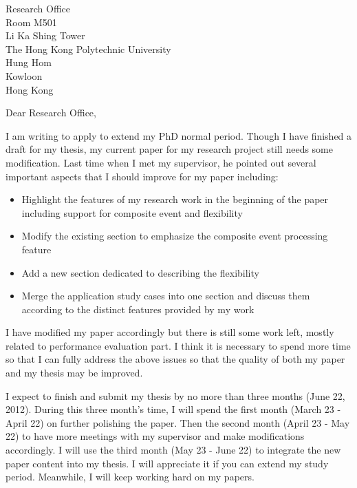 \documentclass[a4paper]{letter}
\begin{document}
\signature{Steven Lai}
\address{Room QT405 \\ The Hong Kong Polytechnic University \\ Hung Hom \\ Kowloon \\ Hong Kong}

\begin{letter}{Research Office \\ Room M501 \\ Li Ka Shing Tower \\ The Hong Kong Polytechnic University \\ Hung Hom \\ Kowloon \\ Hong Kong}
\opening{Dear Research Office,}

I am writing to apply to extend my PhD normal period. Though I have finished a draft for my thesis, my current paper for my research project still needs some modification. Last time when I met my supervisor, he pointed out several important aspects that I should improve for my paper including:
\begin{itemize}
\item Highlight the features of my research work in the beginning of the paper including support for composite event and flexibility
\item Modify the existing section to emphasize the composite event processing feature
\item Add a new section dedicated to describing the flexibility
\item Merge the application study cases into one section and discuss them according to the distinct features provided by my work
\end{itemize}

I have modified my paper accordingly but there is still some work left, mostly related to performance evaluation part. I think it is necessary to spend more time so that I can fully address the above issues so that the quality of both my paper and my thesis may be improved.

I expect to finish and submit my thesis by no more than three months (June 22, 2012). During this three month's time, I will spend the first month (March 23 - April 22) on further polishing the paper. Then the second month (April 23 - May 22) to have more meetings with my supervisor and make modifications accordingly. I will use the third month (May 23 - June 22) to integrate the new paper content into my thesis. I will appreciate it if you can extend my study period. Meanwhile, I will keep working hard on my papers.


\end{letter}
\end{document}
